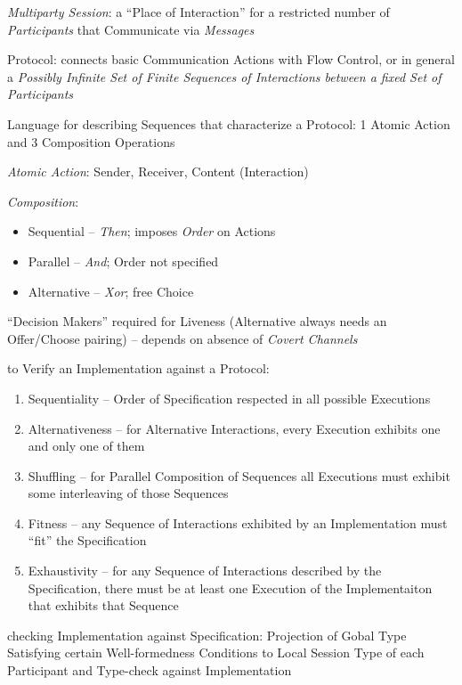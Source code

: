 \emph{Multiparty Session}: a ``Place of Interaction'' for a restricted
number of \emph{Participants} that Communicate via \emph{Messages}

Protocol: connects basic Communication Actions with Flow Control, or
in general a \emph{Possibly Infinite Set of Finite Sequences of
  Interactions between a fixed Set of Participants}

Language for describing Sequences that characterize a Protocol: 1
Atomic Action and 3 Composition Operations

\emph{Atomic Action}: Sender, Receiver, Content (Interaction)

\emph{Composition}:

\begin{itemize}
  \item Sequential -- \emph{Then}; imposes \emph{Order} on Actions
  \item Parallel -- \emph{And}; Order not specified
  \item Alternative -- \emph{Xor}; free Choice
\end{itemize}

``Decision Makers'' required for Liveness (Alternative always needs an
Offer/Choose pairing) -- depends on absence of \emph{Covert Channels}

to Verify an Implementation against a Protocol:

\begin{enumerate}
  \item Sequentiality -- Order of Specification respected in all
    possible Executions
  \item Alternativeness -- for Alternative Interactions, every
    Execution exhibits one and only one of them
  \item Shuffling -- for Parallel Composition of Sequences all
    Executions must exhibit some interleaving of those Sequences
  \item Fitness -- any Sequence of Interactions exhibited by an
    Implementation must ``fit'' the Specification
  \item Exhaustivity -- for any Sequence of Interactions described by
    the Specification, there must be at least one Execution of the
    Implementaiton that exhibits that Sequence
\end{enumerate}

checking Implementation against Specification: Projection of Gobal
Type Satisfying certain Well-formedness Conditions to Local Session
Type of each Participant and Type-check against Implementation

